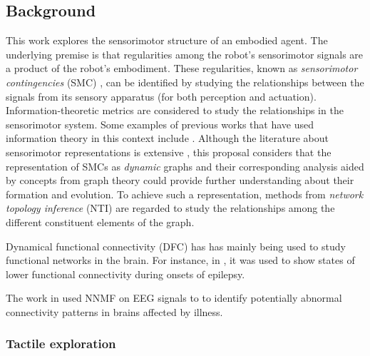 \subsection{Background}
This work explores the sensorimotor structure of an embodied agent. The underlying premise is that regularities among the robot's sensorimotor signals are a product of the robot’s embodiment. These regularities, known as \emph{sensorimotor contingencies} (SMC) \cite{Jacquey2019Sensorimotorcontingenciesas}, can be identified by studying the relationships between the signals from its sensory apparatus (for both perception and actuation). Information-theoretic metrics are considered to study the relationships in the sensorimotor system. Some examples of previous works that have used information theory in this context include  \cite{Schmidt2013Bootstrappingperceptionusing,Lungarella2006Mappinginformationflow,Polani2009Modelsinformationprocessing,Bossomaier2016introductiontransferentropy,Olsson2006unknownsensorsactuators}. Although the literature about sensorimotor representations is extensive \cite{Nguyen2021Sensorimotorrepresentationlearning}, this proposal considers that the representation of SMCs as \emph{dynamic} graphs and their corresponding analysis aided by concepts from graph theory could provide further understanding about their formation and evolution. To achieve such a representation, methods from \emph{network topology inference} (NTI)\cite{Dong2019Learninggraphsdata} are regarded to study the relationships among the different constituent elements of the graph.

Dynamical functional connectivity (DFC) has has mainly being used to study functional networks in the brain. For instance, in \cite{Christiaen2020Dynamicfunctionalconnectivity}, it was used to show states of lower functional connectivity during onsets of epilepsy.

The work in \cite{Zhou2020Earlychildhooddevelopmental} used NNMF on EEG signals to to identify potentially abnormal connectivity patterns in brains affected by illness.

\subsubsection{Tactile exploration}

